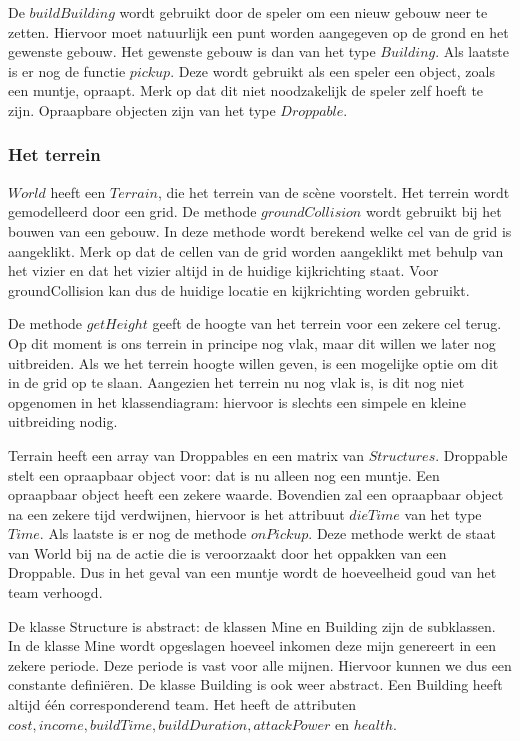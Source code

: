 \documentclass[a4paper,11pt]{article}
\begin{document}
De $buildBuilding$ wordt gebruikt door de speler om een nieuw gebouw neer te zetten. Hiervoor moet natuurlijk een punt worden aangegeven op de grond en het gewenste gebouw. Het gewenste gebouw is dan van het type $Building$. Als laatste is er nog de functie $pickup$. Deze wordt gebruikt als een speler een object, zoals een muntje, opraapt. Merk op dat dit niet noodzakelijk de speler zelf hoeft te zijn. Opraapbare objecten zijn van het type $Droppable$.

\subsubsection{Het terrein}
$World$ heeft een $Terrain$, die het terrein van de sc\`ene voorstelt. Het terrein wordt gemodelleerd door een grid. De methode $groundCollision$ wordt gebruikt bij het bouwen van een gebouw. In deze methode wordt berekend welke cel van de grid is aangeklikt. Merk op dat de cellen van de grid worden aangeklikt met behulp van het vizier en dat het vizier altijd in de huidige kijkrichting staat. Voor groundCollision kan dus de huidige locatie en kijkrichting worden gebruikt.

De methode $getHeight$ geeft de hoogte van het terrein voor een zekere cel terug. Op dit moment is ons terrein in principe nog vlak, maar dit willen we later nog uitbreiden. Als we het terrein hoogte willen geven, is een mogelijke optie om dit in de grid op te slaan. Aangezien het terrein nu nog vlak is, is dit nog niet opgenomen in het klassendiagram: hiervoor is slechts een simpele en kleine uitbreiding nodig.

Terrain heeft een array van Droppables en een matrix van $Structures$. Droppable stelt een opraapbaar object voor: dat is nu alleen nog een muntje. Een opraapbaar object heeft een zekere waarde. Bovendien zal een opraapbaar object na een zekere tijd verdwijnen, hiervoor is het attribuut $dieTime$ van het type $Time$. Als laatste is er nog de methode $onPickup$. Deze methode werkt de staat van World bij na de actie die is veroorzaakt door het oppakken van een Droppable. Dus in het geval van een muntje wordt de hoeveelheid goud van het team verhoogd.

De klasse Structure is abstract: de klassen Mine en Building zijn de subklassen. In de klasse Mine wordt opgeslagen hoeveel inkomen deze mijn genereert in een zekere periode. Deze periode is vast voor alle mijnen. Hiervoor kunnen we dus een constante defini\"eren. De klasse Building is ook weer abstract. Een Building heeft altijd \'e\'en corresponderend team. Het heeft de attributen $cost, income, buildTime, buildDuration, attackPower$ en $health$.
\end{document}
